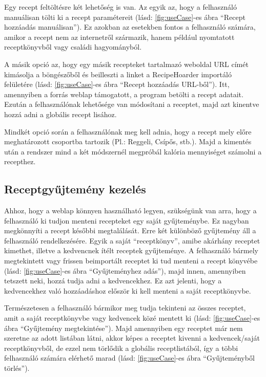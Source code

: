 \documentclass[12pt]{report}
\theoremstyle{definition}
\begin{document}
Egy recept feltöltésre két lehetőség is van. Az egyik az, hogy a felhasználó manuálisan tölti ki a recept paramétereit (lásd: \ref{fig:useCase}-es ábra “Recept hozzáadás manuálisan”). Ez azokban az esetekben fontos a felhasználó számára, amikor a recept nem az internetről származik, hanem például nyomtatott receptkönyvből vagy családi hagyományból. 

A másik opció az, hogy egy másik recepteket tartalmazó weboldal URL címét kimásolja a böngészőből és beilleszti a linket a RecipeHoarder importáló felületére (lásd: \ref{fig:useCase}-es ábra “Recept hozzáadás URL-ből”). Itt, amennyiben a forrás weblap támogatott, a program betölti a recept adatait. Ezután a felhasználónak lehetősége van módosítani a receptet, majd azt kinentve hozzá adni a globális recept lisához.

Mindkét opció során a felhasználónak meg kell adnia, hogy a recept mely előre meghatározott csoportba tartozik (Pl.: Reggeli, Csípős, stb.). Majd a kimentés után a rendszer mind a két módszernél megpróbál kalória mennyiséget számolni a recepthez.


\subsection{Receptgyűjtemény kezelés}
Ahhoz, hogy a weblap könnyen használható legyen, szükségünk van arra, hogy a felhasználó ki tudjon menteni recepteket egy saját gyűjteménybe. Ez nagyban megkönnyíti a recept későbbi megtalálását. Erre két különböző gyűjtemény áll a felhasználó rendelkezésére. Egyik a saját “receptkönyv”, amibe akárhány receptet kimethet, illetve a kedvencnek ítélt receptek gyűjteménye. A felhasználó bármely megtekintett vagy frissen beimportált receptet ki tud menteni a recept könyvébe (lásd: \ref{fig:useCase}-es ábra “Gyűjteményhez adás”), majd innen, amennyiben tetszett neki, hozzá tudja adni a kedvencekhez. Ez azt jelenti, hogy a kedvencekhez való hozzáadáshoz először ki kell menteni  a saját receptkönyvbe.

Természetesen a felhasználó bármikor meg tudja tekinteni az összes receptet, amit a saját receptkönyvbe vagy kedvencek közé mentett ki (lásd: \ref{fig:useCase}-es ábra “Gyűjtemény megtekintése”). Majd amennyiben egy receptet már nem szeretne az adott listában látni, akkor képes a receptet kivenni a kedvencek/saját receptkönyvből, de ezzel nem törlődik a globális receptlistából, így a többi felhasználó számára elérhető marad (lásd: \ref{fig:useCase}-es ábra “Gyűjteményből törlés”). 
\end{document}
